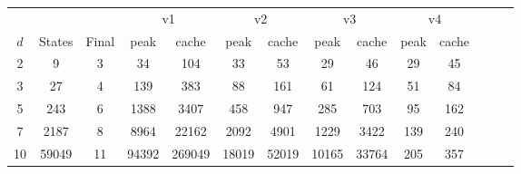 \begin{tabular}{|c||c|c|c|c|c|c|c|c|c|c|c|c|c|}
\hline
        &  	&    	    & \multicolumn{2}{c|}{v1}  & \multicolumn{2}{c|}{v2}    & \multicolumn{2}{c|}{v3}  & \multicolumn{2}{c|}{v4}  \\
\cline{4-11}
$d$       & States    & Final    & peak    & cache & peak    & cache & peak    & cache  & peak    & cache   \\  
\hline
2 & 9 & 3 & 34 & 104 & 33 & 53 & 29 & 46 & 29 & 45 \\
3& 27 & 4 & 139 & 383 & 88 & 161 & 61 & 124 & 51 & 84 \\
5 & 243 & 6 & 1388 & 3407 & 458 & 947 & 285 &703 &95 & 162 \\
7 & 2187 & 8 & 8964 & 22162 & 2092 & 4901 &1229 & 3422 & 139 &240 \\
10 & 59049 & 11 & 94392 & 269049 & 18019 &52019 & 10165 &33764 &205 & 357 \\
\hline
\end{tabular}
